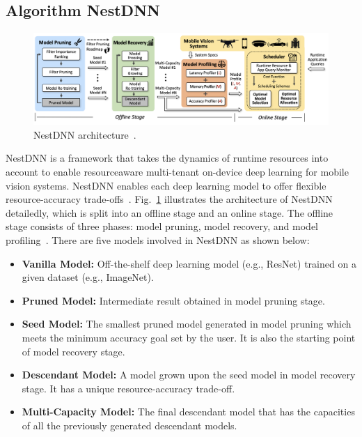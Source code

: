 \documentclass{article}
\begin{document}
\subsection{Algorithm NestDNN}\label{nestdnn}
\begin{figure}[htbp]
	\centering
	\includegraphics[width=1\linewidth]{figure/nestdnn_arch.png}
	\caption{NestDNN architecture~\cite{fang2018nestdnn}.}
	\label{nestdnn_arch}
\end{figure}

NestDNN is a framework that takes the dynamics of runtime resources into account to enable resourceaware multi-tenant on-device deep learning for mobile vision systems. NestDNN enables each deep learning model to offer flexible resource-accuracy trade-offs~\cite{fang2018nestdnn}. Fig.~\ref{nestdnn_arch} illustrates the architecture of NestDNN detailedly, which is split into an offline stage and an online stage. The offline stage consists of three phases: model pruning, model recovery, and model profiling~\cite{fang2018nestdnn}. There are five models involved in NestDNN as shown below:

\begin{itemize}
	\item \textbf{Vanilla Model:} Off-the-shelf deep learning model (e.g., ResNet) trained on a given dataset (e.g., ImageNet).
	
	\item \textbf{Pruned Model:} Intermediate result obtained in model pruning stage.
	
	\item \textbf{Seed Model:} The smallest pruned model generated in model pruning which meets the minimum accuracy goal set by the user. It is also the starting point of model recovery stage.
	
	\item \textbf{Descendant Model:} A model grown upon the seed model in model recovery stage. It has a unique resource-accuracy trade-off.
	
	\item \textbf{Multi-Capacity Model:} The final descendant model that has the capacities of all the previously generated descendant models.
	
\end{itemize}
\end{document}
